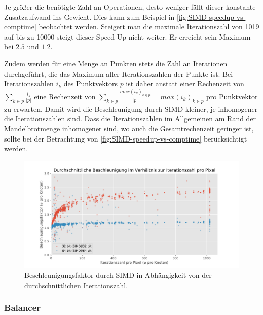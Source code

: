 Je größer die benötigte Zahl an Operationen, desto weniger fällt dieser konstante Zusatzaufwand ins Gewicht.
Dies kann zum Beispiel in \autoref{fig:SIMD-speedup-vs-comptime} beobachtet werden.
Steigert man die maximale Iterationszahl von 1019 auf bis zu 10000 steigt dieser Speed-Up nicht weiter.
Er erreicht sein Maximum bei $2.5$ und $1.2$.

Zudem werden für eine Menge an Punkten stets die Zahl an Iterationen durchgeführt,
die das Maximum aller Iterationszahlen der Punkte ist.
Bei Iterationszahlen \(i_k\) des Punktvektors \(p\) ist daher
anstatt einer Rechenzeit von \(\sum_{k \in p} \frac{i_k }{ | p | }\) eine Rechenzeit von
\(\sum_{k \in p} \frac{max(i_k)_{k \in p }}{|p|} = max(i_k)_{k \in p }\) pro Punktvektor zu erwarten.
Damit wird die Beschleunigung durch SIMD kleiner, je inhomogener die Iterationszahlen sind.
Dass die Iterationszahlen im Allgemeinen am Rand der Mandelbrotmenge inhomogener sind,
wo auch die Gesamtrechenzeit geringer ist, sollte bei der Betrachtung von \autoref{fig:SIMD-speedup-vs-comptime} berücksichtigt werden.

\begin{figure}
	\centering
	\includegraphics[width=0.9\linewidth]{img/Evaluation/simd/speedup.pdf}
	\caption{Beschleunigungsfaktor durch SIMD in Abhängigkeit von der durchschnittlichen Iterationszahl.}
	\label{fig:SIMD-speedup-vs-comptime}
\end{figure}


\subsubsection{Balancer}




